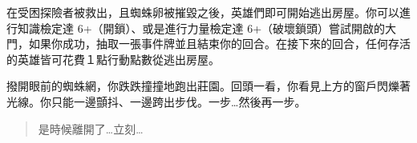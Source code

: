 在受困探險者被救出，且蜘蛛卵被摧毀之後，英雄們即可開始逃出房屋。你可以進行知識檢定達 6+（開鎖）、或是進行力量檢定達 6+（破壞鎖頭）嘗試開啟的大門，如果你成功，抽取一張事件牌並且結束你的回合。在接下來的回合，任何存活的英雄皆可花費１點行動點數從逃出房屋。

\begin{HauntStory}
  撥開眼前的蜘蛛網，你跌跌撞撞地跑出莊園。回頭一看，你看見上方的窗戶閃爍著光線。你只能一邊顫抖、一邊跨出步伐。一步…然後再一步。

  \begin{quote}
    是時候離開了…立刻…
  \end{quote}
\end{HauntStory}
